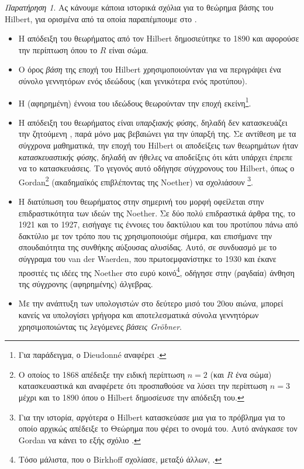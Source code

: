\documentclass[12pt,a4paper,reqno]{amsart}
\theoremstyle{definition}
\theoremstyle{remark}
\newtheorem*{remark}{Παρατήρηση}
\numberwithin{theorem}{section}
\numberwithin{exercise}{section}
\numberwithin{equation}{section}
\begin{document}
\begin{remark}
    Ας κάνουμε κάποια ιστορικά σχόλια για το θεώρημα βάσης του Hilbert, για ορισμένα από τα οποία παραπέμπουμε στο \cite{Kle07}. 
    \begin{itemize}
        \item Η απόδειξη του θεωρήματος από τον Hilbert δημοσιεύτηκε το 1890 και αφορούσε την περίπτωση όπου το $R$ είναι σώμα.
        \item Ο όρος \emph{βάση} της εποχή του Hilbert χρησιμοποιούνταν για να περιγράψει ένα σύνολο γεννητόρων ενός ιδεώδους (και γενικότερα ενός προτύπου).
        \item Η (αφηρημένη) έννοια του ιδεώδους θεωρούνταν  την εποχή εκείνη\footnote{Για παράδειγμα, ο Dieudonn\'e αναφέρει .}. 
        \item Η απόδειξη του θεωρήματος είναι \emph{υπαρξιακής φύσης}, δηλαδή δεν κατασκευάζει την ζητούμενη , παρά μόνο μας βεβαιώνει για την ύπαρξή της. Σε αντίθεση με τα σύγχρονα μαθηματικά, την εποχή του Hilbert οι αποδείξεις των θεωρημάτων ήταν \emph{κατασκευαστικής φύσης}, δηλαδή αν ήθελες να αποδείξεις ότι κάτι υπάρχει έπρεπε να το κατασκευάσεις. Το γεγονός αυτό οδήγησε σύγχρονους του Hilbert, όπως ο Gordan\footnote{Ο οποίος το 1868 απέδειξε την ειδική περίπτωση $n=2$ (και $R$ ένα σώμα) κατασκευαστικά και αναφέρετε ότι προσπαθούσε να λύσει την περίπτωση $n=3$ μέχρι και το 1890 όπου ο Hilbert δημοσίευσε την απόδειξη του.} (ακαδημαϊκός επιβλέποντας της Noether) να σχολιάσουν \footnote{Για την ιστορία, αργότερα ο Hilbert κατασκεύασε μια  για το πρόβλημα για το οποίο αρχικώς απέδειξε το Θεώρημα που φέρει το ονομά του. Αυτό ανάγκασε τον Gordan να κάνει το εξής σχόλιο .}.
        \item Η διατύπωση του θεωρήματος στην σημερινή του μορφή οφείλεται στην επιδραστικό\-τητα των ιδεών της Noether. Σε δύο πολύ επιδραστικά άρθρα της, το 1921 και το 1927, εισήγαγε τις έννοιες του δακτύλιου και του προτύπου πάνω από δακτύλιο με τον τρόπο που τις χρησιμοποιούμε σήμερα, και επισήμανε την σπουδαιότητα της συνθήκης αύξουσας αλυσίδας. Αυτό, σε συνδυασμό με το σύγγραμα  του van der Waerden, που πρωτοεμφανίστηκε το 1930 και έκανε προσιτές τις ιδέες της Noether στο ευρύ κοινό\footnote{Τόσο μάλιστα, που ο Birkhoff σχολίασε, μεταξύ άλλων, .}, οδήγησε στην (ραγδαία) άνθηση της σύγχρονης (αφηρημένης) άλγεβρας.
        \item Με την ανάπτυξη των υπολογιστών στο δεύτερο μισό του 20ου αιώνα, μπορεί κανείς να υπολογίσει γρήγορα και αποτελεσματικά σύνολα γεννητόρων χρησιμοποιώντας τις λεγόμενες \emph{βάσεις Gr\"{o}bner}.
    \end{itemize}
\end{remark}
\end{document}
